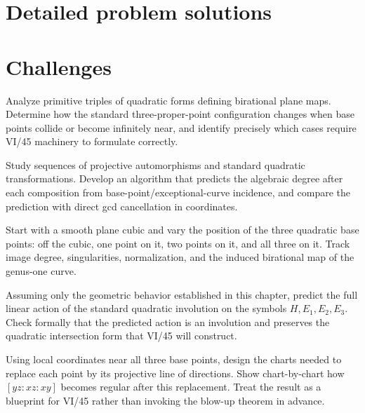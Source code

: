 \ifdefined\FullProblemDossiers
\section{Detailed problem solutions}

\fi

\section{Challenges}

\begin{problem}\label{chal:vi44-01}
Analyze primitive triples of quadratic forms defining birational plane maps.  Determine how the standard three-proper-point configuration changes when base points collide or become infinitely near, and identify precisely which cases require VI/45 machinery to formulate correctly.
\end{problem}

\begin{problem}\label{chal:vi44-02}
Study sequences of projective automorphisms and standard quadratic transformations.  Develop an algorithm that predicts the algebraic degree after each composition from base-point/exceptional-curve incidence, and compare the prediction with direct gcd cancellation in coordinates.
\end{problem}

\begin{problem}\label{chal:vi44-03}
Start with a smooth plane cubic and vary the position of the three quadratic base points: off the cubic, one point on it, two points on it, and all three on it.  Track image degree, singularities, normalization, and the induced birational map of the genus-one curve.
\end{problem}

\begin{problem}\label{chal:vi44-04}
Assuming only the geometric behavior established in this chapter, predict the full linear action of the standard quadratic involution on the symbols \(H,E_1,E_2,E_3\).  Check formally that the predicted action is an involution and preserves the quadratic intersection form that VI/45 will construct.
\end{problem}

\begin{problem}\label{chal:vi44-05}
Using local coordinates near all three base points, design the charts needed to replace each point by its projective line of directions.  Show chart-by-chart how \([yz:xz:xy]\) becomes regular after this replacement.  Treat the result as a blueprint for VI/45 rather than invoking the blow-up theorem in advance.
\end{problem}

